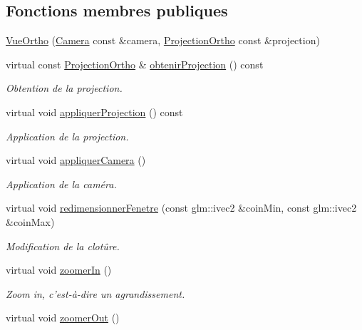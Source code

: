 \subsection*{Fonctions membres publiques}
\begin{DoxyCompactItemize}
\item 
\hyperlink{classvue_1_1_vue_ortho_a6bfb00557ce06ac18b021650a15ded67}{Vue\-Ortho} (\hyperlink{classvue_1_1_camera}{Camera} const \&camera, \hyperlink{classvue_1_1_projection_ortho}{Projection\-Ortho} const \&projection)
\item 
virtual const \hyperlink{classvue_1_1_projection_ortho}{Projection\-Ortho} \& \hyperlink{classvue_1_1_vue_ortho_a732dee29813a40b6404eb7ed06287a8e}{obtenir\-Projection} () const 
\begin{DoxyCompactList}\small\item\em Obtention de la projection. \end{DoxyCompactList}\item 
virtual void \hyperlink{classvue_1_1_vue_ortho_a188cf5eb7c0a24536d1ab73b18f93f63}{appliquer\-Projection} () const 
\begin{DoxyCompactList}\small\item\em Application de la projection. \end{DoxyCompactList}\item 
virtual void \hyperlink{classvue_1_1_vue_ortho_a350f252af3f117706ce918c24d14bb9c}{appliquer\-Camera} ()
\begin{DoxyCompactList}\small\item\em Application de la caméra. \end{DoxyCompactList}\item 
virtual void \hyperlink{classvue_1_1_vue_ortho_ad2e8ccf82efadbc00c2900eb5e549d6f}{redimensionner\-Fenetre} (const glm\-::ivec2 \&coin\-Min, const glm\-::ivec2 \&coin\-Max)
\begin{DoxyCompactList}\small\item\em Modification de la clotûre. \end{DoxyCompactList}\item 
virtual void \hyperlink{classvue_1_1_vue_ortho_a9d43decb227db8bf71905227904b6953}{zoomer\-In} ()
\begin{DoxyCompactList}\small\item\em Zoom in, c'est-\/à-\/dire un agrandissement. \end{DoxyCompactList}\item 
virtual void \hyperlink{classvue_1_1_vue_ortho_a16855ff46992fd6ff9e306058f90924a}{zoomer\-Out} ()

\end{DoxyCompactItemize}
